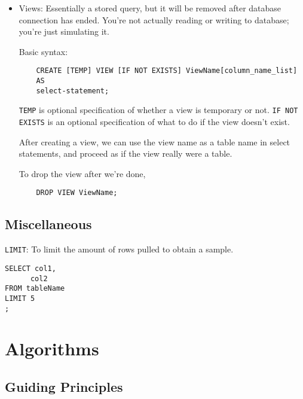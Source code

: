 \documentclass[12pt]{article}
\theoremstyle{plain}
\theoremstyle{definition}
\theoremstyle{remark}
\begin{document}
\begin{itemize}
  \item Views:
    Essentially a stored query, but it will be removed after database
    connection has ended. You're not actually reading or writing to
    database; you're just simulating it.

    Basic syntax:
    \begin{lstlisting}
    CREATE [TEMP] VIEW [IF NOT EXISTS] ViewName[column_name_list]
    AS
    select-statement;
    \end{lstlisting}
    \texttt{TEMP} is optional specification of whether a view is
    temporary or not. \texttt{IF NOT EXISTS} is an optional
    specification of what to do if the view doesn't exist.

    After creating a view, we can use the view name as a table name in
    select statements, and proceed as if the view really were a table.

    To drop the view after we're done,
    \begin{lstlisting}
    DROP VIEW ViewName;
    \end{lstlisting}

\end{itemize}



\subsection{Miscellaneous}

\texttt{LIMIT}:
To limit the amount of rows pulled to obtain a sample.
\begin{lstlisting}
SELECT col1,
      col2
FROM tableName
LIMIT 5
;
\end{lstlisting}




\section{Algorithms}

\subsection{Guiding Principles}
\end{document}

